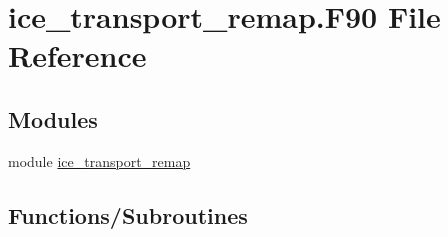 \hypertarget{ice__transport__remap_8F90}{
\section{ice\_\-transport\_\-remap.F90 File Reference}
\label{ice__transport__remap_8F90}
}
\subsection*{Modules}
\begin{DoxyCompactItemize}
\item 
module \hyperlink{namespaceice__transport__remap}{ice\_\-transport\_\-remap}
\end{DoxyCompactItemize}
\subsection*{Functions/Subroutines}
